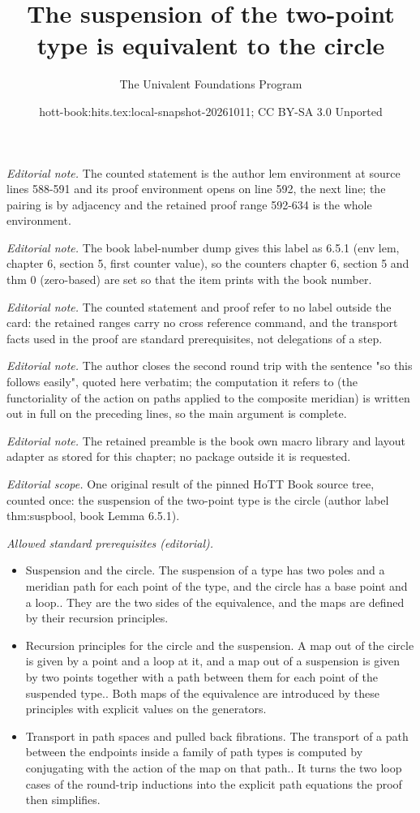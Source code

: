 \documentclass[10pt,a4paper]{article}
\title{The suspension of the two-point type is equivalent to the circle}
\author{The Univalent Foundations Program}
\date{hott-book:hits.tex:local-snapshot-20261011; CC BY-SA 3.0 Unported}
\newcounter{chapter}
\theoremstyle{definition}
\theoremstyle{remark}
\numberwithin{equation}{section}
\begin{document}
\maketitle
\setcounter{chapter}{6}
\setcounter{section}{5}
\setcounter{thm}{0}
\noindent\textit{Editorial note.} The counted statement is the author lem environment at source lines 588-591 and its proof environment opens on line 592, the next line; the pairing is by adjacency and the retained proof range 592-634 is the whole environment.\par\medskip
\noindent\textit{Editorial note.} The book label-number dump gives this label as 6.5.1 (env lem, chapter 6, section 5, first counter value), so the counters chapter 6, section 5 and thm 0 (zero-based) are set so that the item prints with the book number.\par\medskip
\noindent\textit{Editorial note.} The counted statement and proof refer to no label outside the card: the retained ranges carry no cross reference command, and the transport facts used in the proof are standard prerequisites, not delegations of a step.\par\medskip
\noindent\textit{Editorial note.} The author closes the second round trip with the sentence "so this follows easily", quoted here verbatim; the computation it refers to (the functoriality of the action on paths applied to the composite meridian) is written out in full on the preceding lines, so the main argument is complete.\par\medskip
\noindent\textit{Editorial note.} The retained preamble is the book own macro library and layout adapter as stored for this chapter; no package outside it is requested.\par\medskip
\noindent\textit{Editorial scope.} One original result of the pinned HoTT Book source tree, counted once: the suspension of the two-point type is the circle (author label thm:suspbool, book Lemma 6.5.1).\par\medskip
\noindent\textit{Allowed standard prerequisites (editorial).}\begin{itemize}
\item Suspension and the circle. The suspension of a type has two poles and a meridian path for each point of the type, and the circle has a base point and a loop.. They are the two sides of the equivalence, and the maps are defined by their recursion principles.
\item Recursion principles for the circle and the suspension. A map out of the circle is given by a point and a loop at it, and a map out of a suspension is given by two points together with a path between them for each point of the suspended type.. Both maps of the equivalence are introduced by these principles with explicit values on the generators.
\item Transport in path spaces and pulled back fibrations. The transport of a path between the endpoints inside a family of path types is computed by conjugating with the action of the map on that path.. It turns the two loop cases of the round-trip inductions into the explicit path equations the proof then simplifies.
\end{itemize}\medskip
\end{document}
